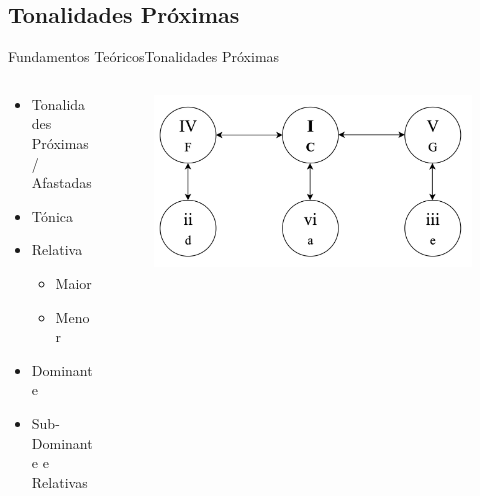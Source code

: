 \subsection{Tonalidades Próximas}
\begin{frame}{Fundamentos Teóricos}{Tonalidades Próximas}
    \begin{columns}[]
        \begin{column}{.5\textwidth}
            \begin{itemize}
            \item Tonalidades Próximas / Afastadas
            \item Tónica
            \item Relativa
            \begin{itemize}
                \item Maior
                \item Menor
            \end{itemize}
            \item Dominante
            \item Sub-Dominante e Relativas
            \end{itemize}
        \end{column}
        \begin{column}{.5\textwidth}
            \begin{figure}
                \includegraphics[width=.9\textwidth]{figs/modulacoes.png}
            \end{figure}
        \end{column}
    \end{columns}
\end{frame}

